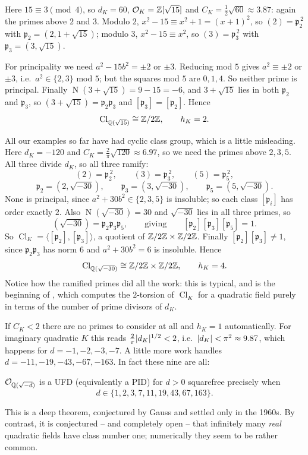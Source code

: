 \documentclass[a4paper]{scrartcl}
\renewcommand{\OO}{\mathcal{O}}
\newcommand{\Nm}{\operatorname{N}}
\newcommand{\Cl}{\operatorname{Cl}}
\newcommand{\fp}{\mathfrak{p}}
\begin{document}
\begin{example}[$K = \Q(\sqrt{15})$]
	Here $15 \equiv 3\pmod4$, so $d_K = 60$, $\OO_K = \Z[\sqrt{15}]$ and $C_K = \tfrac12\sqrt{60}\approx3.87$: again the primes above $2$ and $3$. Modulo $2$, $x^2-15 \equiv x^2+1 = (x+1)^2$, so $(2) = \fp_2^{\,2}$ with $\fp_2 = (2,1+\sqrt{15})$; modulo $3$, $x^2-15\equiv x^2$, so $(3) = \fp_3^{\,2}$ with $\fp_3 = (3,\sqrt{15})$.

	For principality we need $a^2-15b^2 = \pm2$ or $\pm3$. Reducing mod $5$ gives $a^2 \equiv \pm2$ or $\pm3$, i.e.\ $a^2 \in \{2,3\}$ mod $5$; but the squares mod $5$ are $0,1,4$. So neither prime is principal. Finally $\Nm(3+\sqrt{15}) = 9-15 = -6$, and $3+\sqrt{15}$ lies in both $\fp_2$ and $\fp_3$, so $(3+\sqrt{15}) = \fp_2\fp_3$ and $[\fp_3]=[\fp_2]$. Hence
	$$\Cl_{\Q(\sqrt{15})}\cong\Z/2\Z, \qquad h_K = 2.$$
\end{example}

\begin{example}[A Non-Cyclic Class Group: $K = \Q(\sqrt{-30})$]
	All our examples so far have had cyclic class group, which is a little misleading. Here $d_K = -120$ and $C_K = \tfrac2\pi\sqrt{120}\approx 6.97$, so we need the primes above $2,3,5$. All three divide $d_K$, so all three ramify:
	$$(2) = \fp_2^{\,2},\qquad (3) = \fp_3^{\,2},\qquad (5) = \fp_5^{\,2},$$
	$$\fp_2 = \left(2,\sqrt{-30}\right),\qquad \fp_3 = \left(3,\sqrt{-30}\right),\qquad \fp_5 = \left(5,\sqrt{-30}\right).$$
	None is principal, since $a^2+30b^2 \in \{2,3,5\}$ is insoluble; so each class $[\fp_i]$ has order exactly $2$. Also $\Nm(\sqrt{-30}) = 30$ and $\sqrt{-30}$ lies in all three primes, so
	$$\left(\sqrt{-30}\right) = \fp_2\fp_3\fp_5, \qquad\text{giving}\qquad [\fp_2][\fp_3][\fp_5] = 1.$$
	So $\Cl_K = \langle[\fp_2],[\fp_3]\rangle$, a quotient of $\mathbb{Z}/2\mathbb{Z}\times\mathbb{Z}/2\mathbb{Z}$. Finally $[\fp_2][\fp_3] \neq 1$, since $\fp_2\fp_3$ has norm $6$ and $a^2+30b^2 = 6$ is insoluble. Hence
	$$\Cl_{\Q(\sqrt{-30})} \cong \Z/2\Z\times\Z/2\Z, \qquad h_K = 4.$$
	Notice how the ramified primes did all the work: this is typical, and is the beginning of , which computes the $2$-torsion of $\Cl_K$ for a quadratic field purely in terms of the number of prime divisors of $d_K$.
\end{example}

\begin{example}
	If $C_K < 2$ there are no primes to consider at all and $h_K = 1$ automatically. For imaginary quadratic $K$ this reads $\tfrac2\pi\lvert d_K\rvert^{1/2} < 2$, i.e.\ $\lvert d_K\rvert < \pi^2 \approx 9.87$, which happens for $d = -1,-2,-3,-7$. A little more work handles $d = -11,-19,-43,-67,-163$. In fact these nine are all:
	\begin{theorem}
		$\OO_{\Q(\sqrt{-d})}$ is a UFD (equivalently a PID) for $d > 0$ squarefree precisely when
		$$d \in \{1,2,3,7,11,19,43,67,163\}.$$
	\end{theorem}
	This is a deep theorem, conjectured by Gauss and settled only in the 1960s. By contrast, it is conjectured -- and completely open -- that infinitely many \emph{real} quadratic fields have class number one; numerically they seem to be rather common.
\end{example}
\end{document}
